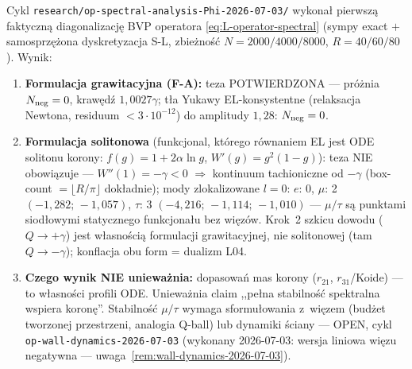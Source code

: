 \begin{remark}%
\label{rem:spectral-CP7}
Cykl \texttt{research/op-spectral-analysis-Phi-2026-07-03/} wykona\l{}
pierwsz\k{a} faktyczn\k{a} diagonalizacj\k{e} BVP operatora
\eqref{eq:L-operator-spectral} (sympy exact $+$ samosprz\k{e}\.zona
dyskretyzacja S-L, zbie\.zno\'s\'c $N{=}2000/4000/8000$,
$R{=}40/60/80$). Wynik:
\begin{enumerate}[nosep]
  \item \textbf{Formulacja grawitacyjna (F-A):} teza POTWIERDZONA ---
    pr\'o\.znia $N_{\rm neg}=0$, kraw\k{e}d\'z $1{,}0027\gamma$; t\l{}a
    Yukawy EL-konsystentne (relaksacja Newtona, residuum $<3\cdot10^{-12}$)
    do amplitudy $1{,}28$: $N_{\rm neg}=0$.
  \item \textbf{Formulacja solitonowa} (funkcjonal, kt\'orego r\'ownaniem
    EL jest ODE solitonu korony: $f(g)=1+2\alpha\ln g$,
    $W'(g)=g^2(1-g)$): teza NIE obowi\k{a}zuje --- $W''(1)=-\gamma<0$
    $\Rightarrow$ kontinuum tachioniczne od $-\gamma$ (box-count
    $=\lfloor R/\pi\rfloor$ dok\l{}adnie); mody zlokalizowane $l{=}0$:
    $e$: 0, $\mu$: 2 $(-1{,}282;\,-1{,}057)$, $\tau$: 3
    $(-4{,}216;\,-1{,}114;\,-1{,}010)$ --- $\mu/\tau$ s\k{a} punktami
    siod\l{}owymi statycznego funkcjona\l{}u bez wi\k{e}z\'ow.
    Krok~2 szkicu dowodu ($Q\to+\gamma$) jest w\l{}asno\'sci\k{a}
    formulacji grawitacyjnej, nie solitonowej (tam $Q\to-\gamma$);
    konflacja obu form = dualizm L04.
  \item \textbf{Czego wynik NIE uniewa\.znia:} dopasowa\'n mas korony
    ($r_{21}$, $r_{31}$/Koide) --- to w\l{}asno\'sci profili ODE.
    Uniewa\.znia claim ,,pe\l{}na stabilno\'s\'c spektralna wspiera
    koron\k{e}''. Stabilno\'s\'c $\mu/\tau$ wymaga sformu\l{}owania
    z~wi\k{e}zem (bud\.zet tworzonej przestrzeni, analogia Q-ball)
    lub dynamiki \'sciany --- OPEN, cykl
    \texttt{op-wall-dynamics-2026-07-03} (wykonany 2026-07-03:
    wersja liniowa wi\k{e}zu negatywna ---
    uwaga~\ref{rem:wall-dynamics-2026-07-03}).
\end{enumerate}
\end{remark}

